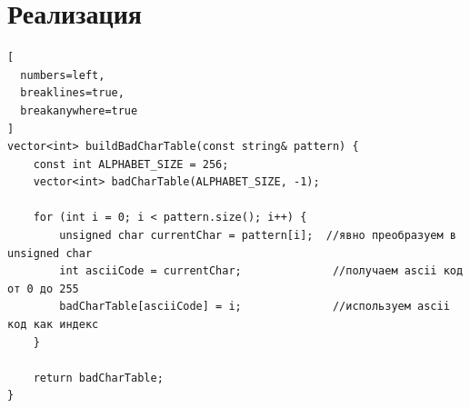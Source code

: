 \documentclass[otchet]{SCWorks}
\begin{document}

\date{2026}

\maketitle

\secNumbering

\tableofcontents




\section{Реализация}

\begin{Verbatim}[
  numbers=left,
  breaklines=true,
  breakanywhere=true
]
vector<int> buildBadCharTable(const string& pattern) {
    const int ALPHABET_SIZE = 256;
    vector<int> badCharTable(ALPHABET_SIZE, -1);

    for (int i = 0; i < pattern.size(); i++) {
        unsigned char currentChar = pattern[i];  //явно преобразуем в unsigned char
        int asciiCode = currentChar;              //получаем ascii код от 0 до 255
        badCharTable[asciiCode] = i;              //используем ascii код как индекс
    }

    return badCharTable;
}
\end{Verbatim}
\end{document}
